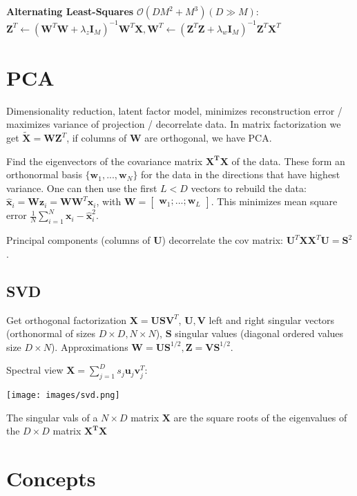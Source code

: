 \documentclass[10pt,a4paper,landscape]{extarticle}
\renewcommand{\bf}[1]{\ensuremath{\mathbf{#1}}}
\begin{document}
\begin{multicols*}{4}
\textbf{Alternating Least-Squares} $\mathcal{O}(DM^2 + M^3) (D \gg M)$: $\bf{Z}^T \leftarrow (\bf{W}^T \bf{W} + \lambda_z \bf{I}_M )^{-1} \bf{W}^T \bf{X},
\bf{W}^T \leftarrow (\bf{Z}^T \bf{Z} + \lambda_w \bf{I}_M )^{-1} \bf{Z}^T \bf{X}^T$

\section{PCA}
Dimensionality reduction, latent factor model, minimizes reconstruction error / maximizes variance of projection / decorrelate data. In matrix factorization we get $\bf{\tilde{X}} = \bf{WZ}^T$, if columns of $\bf{W}$ are orthogonal, we have PCA.

Find the eigenvectors of the covariance matrix $\bf{X^T X}$ of the data. These form an orthonormal basis $\{ \bf{w}_1, ..., \bf{w}_N\}$ for the data in the directions that have highest variance.
One can then use the first $L < D$ vectors to rebuild the data: $\bf{\hat{x}}_i = \bf{W} \bf{z}_i = \bf{W} \bf{W}^T \bf{x}_i$, with $\bf{W} = \begin{bmatrix} \bf{w}_1 ; ... ; \bf{w}_L \end{bmatrix}$.
This minimizes mean square error $\frac{1}{N} \sum_{i=1}^N \bf{x}_i - \bf{\hat{x}}_i^2$.

Principal components (columns of $\bf{U}$) decorrelate the cov matrix: $\bf{U}^T \bf{XX}^T \bf{U} = \bf{S}^2$.

\subsection{SVD}
Get orthogonal factorization $\bf{X} = \bf{USV}^T$, $\bf{U}, \bf{V}$ left and right singular vectors (orthonormal of sizes $D \times D, N \times N$), $\bf{S}$ singular values (diagonal ordered values size $D \times N$). Approximations $\bf{W} = \bf{US}^{1/2}, \bf{Z} = \bf{VS}^{1/2}$.

Spectral view $\bf{X} = \sum_{j=1}^D s_j \bf{u}_j \bf{v}_j^T$:
\begin{colfig}
  \centering
  \texttt{[image: images/svd.png]}
\end{colfig}

The singular vals of a $N \times D$ matrix $\bf{X}$ are the square roots of the eigenvalues of the $D \times D$ matrix $\bf{X^T X}$


\section{Concepts}


\end{multicols*}
\end{document}
